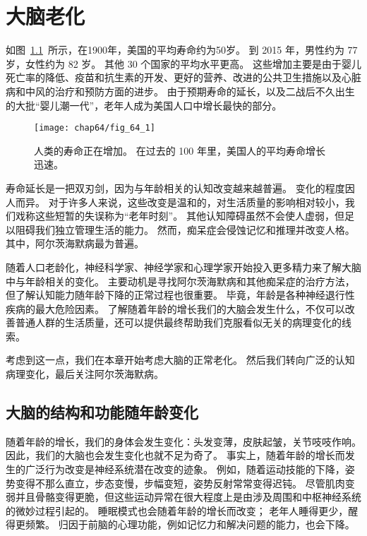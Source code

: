 \chapter{大脑老化} \label{chap:chap64}

如图~\ref{fig:64_1}~所示，在1900年，美国的平均寿命约为50岁。
到 2015 年，男性约为 77 岁，女性约为 82 岁。
其他 30 个国家的平均水平更高。
这些增加主要是由于婴儿死亡率的降低、疫苗和抗生素的开发、更好的营养、改进的公共卫生措施以及心脏病和中风的治疗和预防方面的进步。
由于预期寿命的延长，以及二战后不久出生的大批“婴儿潮一代”，老年人成为美国人口中增长最快的部分。


\begin{figure}[htbp]
	\centering
	\texttt{[image: chap64/fig\_64\_1]}
	\caption{人类的寿命正在增加。
		在过去的 100 年里，美国人的平均寿命增长迅速\cite{strehler1975implications,arias2007united}。}
	\label{fig:64_1}
\end{figure}


寿命延长是一把双刃剑，因为与年龄相关的认知改变越来越普遍。
变化的程度因人而异。
对于许多人来说，这些改变是温和的，对生活质量的影响相对较小，我们戏称这些短暂的失误称为“老年时刻”。
其他认知障碍虽然不会使人虚弱，但足以阻碍我们独立管理生活的能力。
然而，痴呆症会侵蚀记忆和推理并改变人格。
其中，阿尔茨海默病最为普遍。


随着人口老龄化，神经科学家、神经学家和心理学家开始投入更多精力来了解大脑中与年龄相关的变化。
主要动机是寻找阿尔茨海默病和其他痴呆症的治疗方法，但了解认知能力随年龄下降的正常过程也很重要。
毕竟，年龄是各种神经退行性疾病的最大危险因素。
了解随着年龄的增长我们的大脑会发生什么，不仅可以改善普通人群的生活质量，还可以提供最终帮助我们克服看似无关的病理变化的线索。


考虑到这一点，我们在本章开始考虑大脑的正常老化。
然后我们转向广泛的认知病理变化，最后关注阿尔茨海默病。



\section{大脑的结构和功能随年龄变化}

随着年龄的增长，我们的身体会发生变化：头发变薄，皮肤起皱，关节吱吱作响。
因此，我们的大脑也会发生变化也就不足为奇了。
事实上，随着年龄的增长而发生的广泛行为改变是神经系统潜在改变的迹象。
例如，随着运动技能的下降，姿势变得不那么直立，步态变慢，步幅变短，姿势反射常常变得迟钝。
尽管肌肉变弱并且骨骼变得更脆，但这些运动异常在很大程度上是由涉及周围和中枢神经系统的微妙过程引起的。
睡眠模式也会随着年龄的增长而改变；
老年人睡得更少，醒得更频繁。
归因于前脑的心理功能，例如记忆力和解决问题的能力，也会下降。


